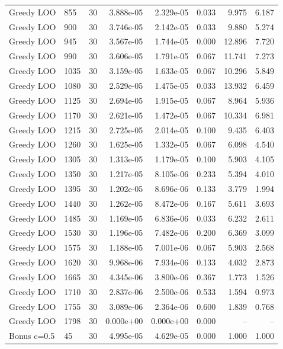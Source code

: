 \begin{scriptsize}
\begin{longtable}{llrrrrrr}
Greedy LOO & 855 & 30 & 3.888e-05 & 2.329e-05 & 0.033 & 9.975 & 6.187 \\
Greedy LOO & 900 & 30 & 3.746e-05 & 2.142e-05 & 0.033 & 9.880 & 5.274 \\
Greedy LOO & 945 & 30 & 3.567e-05 & 1.744e-05 & 0.000 & 12.896 & 7.720 \\
Greedy LOO & 990 & 30 & 3.606e-05 & 1.791e-05 & 0.067 & 11.741 & 7.273 \\
Greedy LOO & 1035 & 30 & 3.159e-05 & 1.633e-05 & 0.067 & 10.296 & 5.849 \\
Greedy LOO & 1080 & 30 & 2.529e-05 & 1.475e-05 & 0.033 & 13.932 & 6.459 \\
Greedy LOO & 1125 & 30 & 2.694e-05 & 1.915e-05 & 0.067 & 8.964 & 5.936 \\
Greedy LOO & 1170 & 30 & 2.621e-05 & 1.472e-05 & 0.067 & 10.334 & 6.981 \\
Greedy LOO & 1215 & 30 & 2.725e-05 & 2.014e-05 & 0.100 & 9.435 & 6.403 \\
Greedy LOO & 1260 & 30 & 1.625e-05 & 1.332e-05 & 0.067 & 6.098 & 4.540 \\
Greedy LOO & 1305 & 30 & 1.313e-05 & 1.179e-05 & 0.100 & 5.903 & 4.105 \\
Greedy LOO & 1350 & 30 & 1.217e-05 & 8.105e-06 & 0.233 & 5.394 & 4.010 \\
Greedy LOO & 1395 & 30 & 1.202e-05 & 8.696e-06 & 0.133 & 3.779 & 1.994 \\
Greedy LOO & 1440 & 30 & 1.262e-05 & 8.472e-06 & 0.167 & 5.611 & 3.693 \\
Greedy LOO & 1485 & 30 & 1.169e-05 & 6.836e-06 & 0.033 & 6.232 & 2.611 \\
Greedy LOO & 1530 & 30 & 1.196e-05 & 7.482e-06 & 0.200 & 6.369 & 3.099 \\
Greedy LOO & 1575 & 30 & 1.188e-05 & 7.001e-06 & 0.067 & 5.903 & 2.568 \\
Greedy LOO & 1620 & 30 & 9.968e-06 & 7.934e-06 & 0.133 & 4.032 & 2.873 \\
Greedy LOO & 1665 & 30 & 4.345e-06 & 3.800e-06 & 0.367 & 1.773 & 1.526 \\
Greedy LOO & 1710 & 30 & 2.837e-06 & 2.500e-06 & 0.533 & 1.594 & 0.973 \\
Greedy LOO & 1755 & 30 & 3.089e-06 & 2.364e-06 & 0.600 & 1.839 & 0.768 \\
Greedy LOO & 1798 & 30 & 0.000e+00 & 0.000e+00 & 0.000 & -- & -- \\
Bonus c=0.5 & 45 & 30 & 4.995e-05 & 4.629e-05 & 0.000 & 1.000 & 1.000 \\

\end{longtable}
\end{scriptsize}
